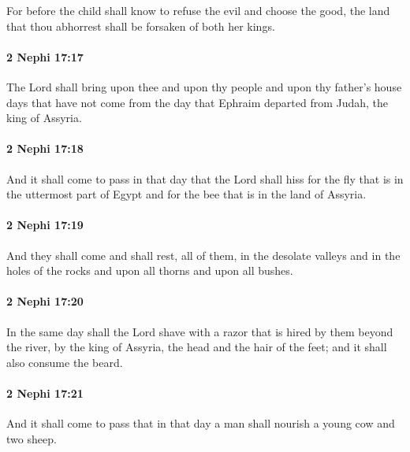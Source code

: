 			For before the child shall know to refuse the evil and choose the good,
			the land that thou abhorrest shall be forsaken of both her kings.

		\paragraph{2 Nephi 17:17} %
			\label{2NEPHI-17-17}

			The Lord shall bring upon thee and upon thy people and upon thy father's house
			days that have not come from the day that Ephraim departed from Judah,
			the king of Assyria.

		\paragraph{2 Nephi 17:18} %
			\label{2NEPHI-17-18}

			And it shall come to pass in that day
			that the Lord shall hiss for the fly that is in the uttermost part of Egypt
			and for the bee that is in the land of Assyria.

		\paragraph{2 Nephi 17:19} %
			\label{2NEPHI-17-19}

			And they shall come and shall rest, all of them,
			in the desolate valleys and in the holes of the rocks
			and upon all thorns and upon all bushes.

		\paragraph{2 Nephi 17:20} %
			\label{2NEPHI-17-20}

			In the same day shall the Lord shave with a razor
			that is hired by them beyond the river, by the king of Assyria,
			the head and the hair of the feet;
			and it shall also consume the beard.

		\paragraph{2 Nephi 17:21} %
			\label{2NEPHI-17-21}

			And it shall come to pass that in that day
			a man shall nourish a young cow and two sheep.

